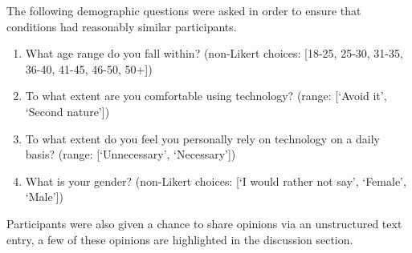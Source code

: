 The following demographic questions were asked in order to ensure that conditions had reasonably similar participants.
\begin{quoting}
\begin{enumerate}[label=\textbf{Demo~\arabic*)}]
    \item What age range do you fall within? (non-Likert choices: [18-25, 25-30, 31-35, 36-40, 41-45, 46-50, 50+])
    \item To what extent are you comfortable using technology? (range: [`Avoid it', `Second nature'])
    \item To what extent do you feel you personally rely on technology on a daily basis? (range: [`Unnecessary', `Necessary'])
    \item What is your gender? (non-Likert choices: [`I would rather not say', `Female', `Male'])
\end{enumerate}
\end{quoting}

Participants were also given a chance to share opinions via an unstructured text entry, a few of these opinions are highlighted in the discussion section.
